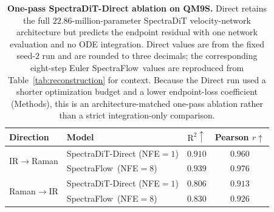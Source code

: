\documentclass[pdflatex,sn-mathphys-num]{sn-jnl}%
\newcommand{\mname}{SpectraFlow}
\theoremstyle{thmstyleone}%
\theoremstyle{thmstyletwo}%
\theoremstyle{thmstylethree}%
\begin{document}
\begin{appendices}
\begin{table}[htbp]
\centering
\caption{\textbf{One-pass SpectraDiT-Direct ablation on QM9S.} Direct retains the full $22.86$-million-parameter SpectraDiT velocity-network architecture but predicts the endpoint residual with one network evaluation and no ODE integration. Direct values are from the fixed seed-$2$ run and are rounded to three decimals; the corresponding eight-step Euler \mname\ values are reproduced from Table~\ref{tab:reconstruction} for context. Because the Direct run used a shorter optimization budget and a lower endpoint-loss coefficient (Methods), this is an architecture-matched one-pass ablation rather than a strict integration-only comparison.}
\label{tab:direct-ablation}
\begin{tabular}{llcc}
\toprule
Direction & Model & $\text{R}^2\uparrow$ & Pearson $r\uparrow$ \\
\midrule
\multirow{2}{*}{IR$\rightarrow$Raman}
& SpectraDiT-Direct (NFE${}=1$) & $0.910$ & $0.960$ \\
& \mname\ (NFE${}=8$) & $\mathbf{0.939}$ & $\mathbf{0.976}$ \\
\midrule
\multirow{2}{*}{Raman$\rightarrow$IR}
& SpectraDiT-Direct (NFE${}=1$) & $0.806$ & $0.913$ \\
& \mname\ (NFE${}=8$) & $\mathbf{0.830}$ & $\mathbf{0.926}$ \\
\bottomrule
\end{tabular}
\end{table}


\end{appendices}
\end{document}
